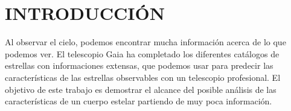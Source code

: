 \section*{INTRODUCCIÓN}\label{sec:intro}
Al observar el cielo, podemos encontrar mucha información acerca de lo que podemos ver. El telescopio Gaia ha completado los diferentes catálogos de estrellas con informaciones extensas, que podemos usar para predecir las características de las estrellas observables con un telescopio profesional. El objetivo de este trabajo es demostrar el alcance del posible análisis de las características de un cuerpo estelar partiendo de muy poca información.
